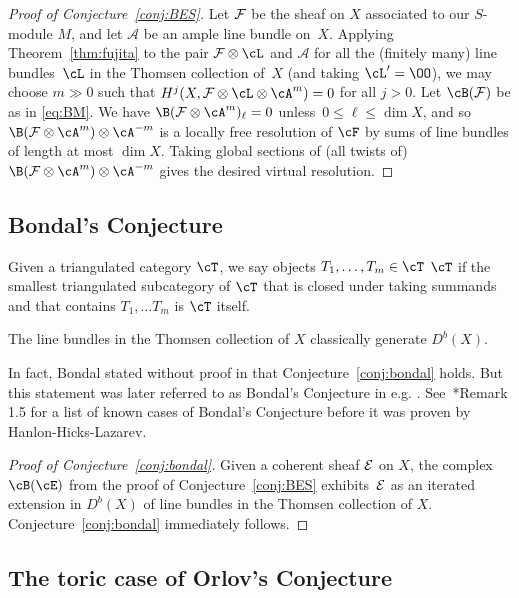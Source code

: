 \documentclass{amsart}
\begin{document}
\begin{proof}[Proof of Conjecture~\ref{conj:BES}]
Let $\mathcal{F}$ be the sheaf on $X$ associated to our $S$-module $M$, and let $\mathcal{A}$ be an ample line bundle on~$X$. Applying Theorem~\ref{thm:fujita} to the pair $\F \otimes \cL$ and $\mathcal{A}$ for all the (finitely many) line bundles~$\cL$ in the Thomsen collection of~$X$ (and taking $\cL' = \OO$), we may choose $m \gg 0$ such that $H^j(X, \F \otimes \cL \otimes \cA^m) = 0$ for all $j > 0$. Let $\cB(\F)$ be as in \eqref{eq:BM}. We have $\B(\F \otimes \cA^m)_\ell = 0$ unless~$0 \le \ell \le \dim X$, and so $\B(\F \otimes \cA^m) \otimes \cA^{-m}$ is a locally free resolution of $\cF$ by sums of line bundles of length at most $\dim{X}$. Taking global sections of (all twists of) $\B(\F \otimes \cA^m) \otimes \cA^{-m}$ gives the desired virtual resolution.
\end{proof}

\subsection{Bondal's Conjecture}\label{subsect:bondalConjecture}

Given a triangulated category $\cT$, we say objects $T_1, \dots, T_m \in \cT$  $\cT$ if the smallest triangulated subcategory of $\cT$ that is closed under taking summands and that contains $T_1, \dots T_m$ is $\cT$ itself.

\begin{conj}
\label{conj:bondal}
The line bundles in the Thomsen collection of $X$ classically generate $D^b(X)$.
\end{conj}

In fact, Bondal stated without proof in \cite{Bondal06} that Conjecture~\ref{conj:bondal} holds. But this statement was later referred to as Bondal's Conjecture in e.g. \cites{Uehara14, HHL24}. See~\cite{HHL24}*{Remark 1.5} for a list of known cases of Bondal's Conjecture before it was proven by Hanlon-Hicks-Lazarev.

\begin{proof}[Proof of Conjecture~\ref{conj:bondal}]
Given a coherent sheaf $\mathcal{E}$ on $X$, the complex $\cB(\cE)$ from the proof of Conjecture~\ref{conj:BES} exhibits~$\mathcal{E}$ as an iterated extension in $D^b(X)$ of line bundles in the Thomsen collection of $X$. Conjecture~\ref{conj:bondal} immediately follows.
\end{proof}

\subsection{The toric case of Orlov's Conjecture}
\end{document}
